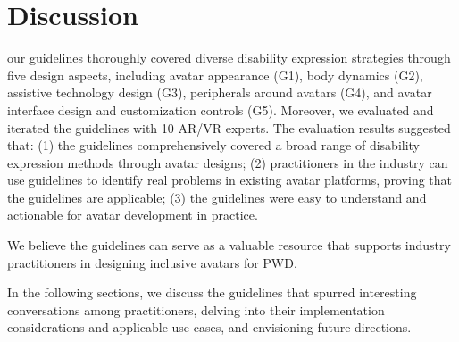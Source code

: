 \section{Discussion}

our guidelines thoroughly covered diverse disability expression strategies through five design aspects, including avatar appearance (G1), body dynamics (G2), assistive technology design (G3), peripherals around avatars (G4), and avatar interface design and customization controls (G5). %
Moreover, we evaluated and iterated the guidelines with 10 AR/VR experts. The evaluation results suggested that: (1) the guidelines comprehensively covered a broad range of disability expression methods through avatar designs; (2) practitioners in the industry can use guidelines to identify real problems in existing avatar platforms, proving that the guidelines are applicable; (3) the guidelines were easy to understand and actionable for avatar development in practice. 

 We believe the guidelines can serve as a valuable resource that supports industry practitioners in designing inclusive avatars for PWD. 

In the following sections, we discuss the guidelines that spurred interesting conversations among practitioners, delving into their implementation considerations and  applicable use cases, and envisioning future directions.

